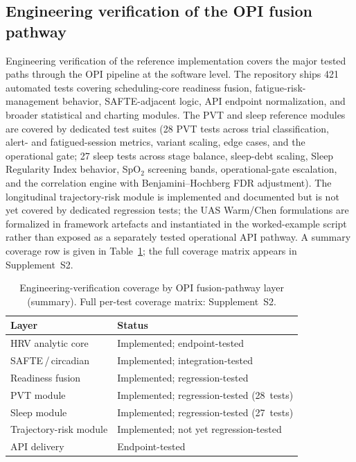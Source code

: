 \documentclass[10pt,journal,twocolumn,compsoc]{IEEEtran}
\begin{document}
\subsection{Engineering verification of the OPI fusion pathway}
\label{sec:verif}
Engineering verification of the reference implementation covers the major tested paths through the OPI pipeline at the software level. The repository ships 421 automated tests covering scheduling-core readiness fusion, fatigue-risk-management behavior, SAFTE-adjacent logic, API endpoint normalization, and broader statistical and charting modules. The PVT and sleep reference modules are covered by dedicated test suites (28 PVT tests across trial classification, alert- and fatigued-session metrics, variant scaling, edge cases, and the operational gate; 27 sleep tests across stage balance, sleep-debt scaling, Sleep Regularity Index behavior, SpO$_2$ screening bands, operational-gate escalation, and the correlation engine with Benjamini--Hochberg FDR adjustment). The longitudinal trajectory-risk module is implemented and documented but is not yet covered by dedicated regression tests; the UAS Warm/Chen formulations are formalized in framework artefacts and instantiated in the worked-example script rather than exposed as a separately tested operational API pathway. A summary coverage row is given in Table~\ref{tab:verif}; the full coverage matrix appears in Supplement~S2.

\begin{table}[t]
\caption{Engineering-verification coverage by OPI fusion-pathway layer (summary). Full per-test coverage matrix: Supplement~S2.}
\label{tab:verif}
\centering
\renewcommand{\arraystretch}{1.1}
\begin{tabularx}{\columnwidth}{@{}l X@{}}
\toprule
Layer & Status \\
\midrule
HRV analytic core      & Implemented; endpoint-tested \\
SAFTE\,/\,circadian    & Implemented; integration-tested \\
Readiness fusion       & Implemented; regression-tested \\
PVT module             & Implemented; regression-tested (28~tests) \\
Sleep module           & Implemented; regression-tested (27~tests) \\
Trajectory-risk module & Implemented; not yet regression-tested \\
API delivery           & Endpoint-tested \\
\bottomrule
\end{tabularx}
\end{table}
\end{document}
